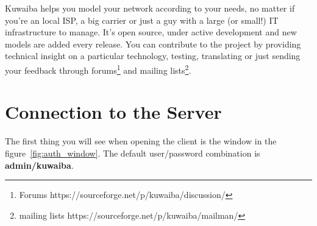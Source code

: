 \documentclass[a4paper]{article}
\begin{document}
	Kuwaiba helps you model your network according to your needs, no matter if you're an local ISP, a big carrier or just a guy with a large (or small!) IT infrastructure to manage. It's open source, under active development and new models are added every release. You can contribute to the project by providing technical insight on a particular technology, testing, translating or just sending your feedback through forums\footnote{Forums https://sourceforge.net/p/kuwaiba/discussion/} and mailing lists\footnote{mailing lists https://sourceforge.net/p/kuwaiba/mailman/}.
	
	\clearpage
	\section{Connection to the Server}
	The first thing you will see when opening the client is the window in the figure~\ref{fig:auth_window}. The default user/password combination is \textbf{admin/kuwaiba}.
	 
\end{document}
